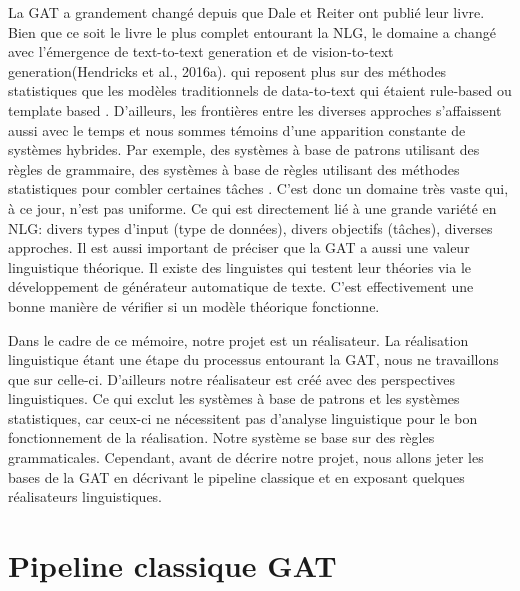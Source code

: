 La \ac{GAT} a grandement changé depuis que Dale et Reiter ont publié leur livre. Bien que ce soit le livre le plus complet entourant la NLG, le domaine a changé avec l'émergence de text-to-text generation et de vision-to-text generation(Hendricks et al., 2016a). qui reposent plus sur des méthodes statistiques que les modèles traditionnels de data-to-text qui étaient rule-based ou template based \citep{gatt18}. D'ailleurs, les frontières entre les diverses approches s'affaissent aussi avec le temps et nous sommes témoins d'une apparition constante de systèmes hybrides. Par exemple, des systèmes à base de patrons utilisant des règles de grammaire, des systèmes à base de règles utilisant des méthodes statistiques pour combler certaines tâches \citep{gatt18}. C'est donc un domaine très vaste qui, à ce jour, n'est pas uniforme. Ce qui est directement lié à une grande variété en NLG: divers types d'input (type de données), divers objectifs (tâches), diverses approches. Il est aussi important de préciser que la \ac{GAT} a aussi une valeur linguistique théorique. Il existe des linguistes qui testent leur théories via le développement de générateur automatique de texte. C'est effectivement une bonne manière de vérifier si un modèle théorique fonctionne\citep{DanlosPresentationmodelegeneration1983}. 

Dans le cadre de ce mémoire, notre projet est un réalisateur. La réalisation linguistique étant une étape du processus entourant la \ac{GAT}, nous ne travaillons que sur celle-ci. D'ailleurs notre réalisateur est créé avec des perspectives linguistiques. Ce qui exclut les systèmes à base de patrons et les systèmes statistiques, car ceux-ci ne nécessitent pas d'analyse linguistique pour le bon fonctionnement de la réalisation. Notre système se base sur des règles grammaticales. Cependant, avant de décrire notre projet, nous allons jeter les bases de la \ac{GAT} en décrivant le pipeline classique et en exposant quelques réalisateurs linguistiques.

\section{Pipeline classique GAT}

